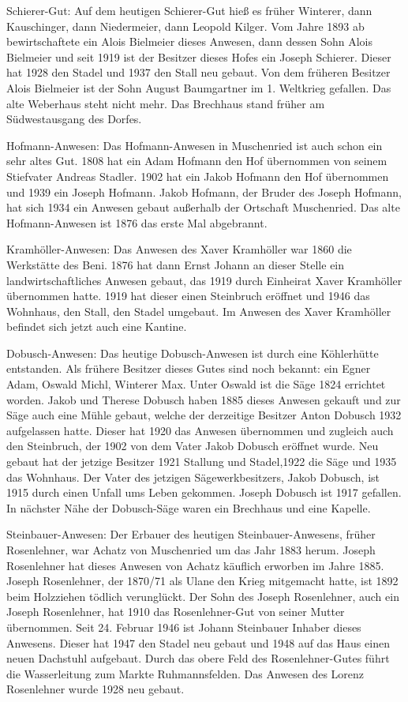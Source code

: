 Schierer-Gut: Auf dem heutigen Schierer-Gut hieß es früher Winterer, dann
Kauschinger, dann Niedermeier, dann Leopold Kilger. Vom Jahre 1893 ab
bewirtschaftete ein Alois Bielmeier dieses Anwesen, dann dessen Sohn Alois
Bielmeier und seit 1919 ist der Besitzer dieses Hofes ein Joseph Schierer.
Dieser hat 1928 den Stadel und 1937 den Stall neu gebaut. Von dem früheren
Besitzer Alois Bielmeier ist der Sohn August Baumgartner im 1. Weltkrieg
gefallen. Das alte Weberhaus steht nicht mehr. Das Brechhaus stand früher am
Südwestausgang des Dorfes.

Hofmann-Anwesen: Das Hofmann-Anwesen in Muschenried ist auch schon ein sehr
altes Gut. 1808 hat ein Adam Hofmann den Hof übernommen von seinem Stiefvater
Andreas Stadler. 1902 hat ein Jakob Hofmann den Hof übernommen und 1939 ein
Joseph Hofmann. Jakob Hofmann, der Bruder des Joseph Hofmann, hat sich 1934 ein
Anwesen gebaut außerhalb der Ortschaft Muschenried. Das alte Hofmann-Anwesen ist
1876 das erste Mal abgebrannt.

Kramhöller-Anwesen: Das Anwesen des Xaver Kramhöller war 1860 die Werkstätte des
Beni. 1876 hat dann Ernst Johann an dieser Stelle ein landwirtschaftliches
Anwesen gebaut, das 1919 durch Einheirat Xaver Kramhöller übernommen hatte. 1919
hat dieser einen Steinbruch eröffnet und 1946 das Wohnhaus, den Stall, den
Stadel umgebaut. Im Anwesen des Xaver Kramhöller befindet sich jetzt auch eine
Kantine.

Dobusch-Anwesen: Das heutige Dobusch-Anwesen ist durch eine Köhlerhütte
entstanden. Als frühere Besitzer dieses Gutes sind noch bekannt: ein Egner Adam,
Oswald Michl, Winterer Max. Unter Oswald ist die Säge 1824 errichtet worden.
Jakob und Therese Dobusch haben 1885 dieses Anwesen gekauft und zur Säge auch
eine Mühle gebaut, welche der derzeitige Besitzer Anton Dobusch 1932 aufgelassen
hatte. Dieser hat 1920 das Anwesen übernommen und zugleich auch den Steinbruch,
der 1902 von dem Vater Jakob Dobusch eröffnet wurde. Neu gebaut hat der jetzige
Besitzer 1921 Stallung und Stadel,1922 die Säge und 1935 das Wohnhaus. Der Vater
des jetzigen Sägewerkbesitzers, Jakob Dobusch, ist 1915 durch einen Unfall ums
Leben gekommen. Joseph Dobusch ist 1917 gefallen. In nächster Nähe der
Dobusch-Säge waren ein Brechhaus und eine Kapelle.

Steinbauer-Anwesen: Der Erbauer des heutigen Steinbauer-Anwesens, früher
Rosenlehner, war Achatz von Muschenried um das Jahr 1883 herum. Joseph
Rosenlehner hat dieses Anwesen von Achatz käuflich erworben im Jahre 1885.
Joseph Rosenlehner, der 1870/71 als Ulane den Krieg mitgemacht hatte, ist 1892
beim Holzziehen tödlich verunglückt. Der Sohn des Joseph Rosenlehner, auch ein
Joseph Rosenlehner, hat 1910 das Rosenlehner-Gut von seiner Mutter übernommen.
Seit 24. Februar 1946 ist Johann Steinbauer Inhaber dieses Anwesens. Dieser hat
1947 den Stadel neu gebaut und 1948 auf das Haus einen neuen Dachstuhl
aufgebaut. Durch das obere Feld des Rosenlehner-Gutes führt die Wasserleitung
zum Markte Ruhmannsfelden. Das Anwesen des Lorenz Rosenlehner wurde 1928 neu
gebaut.

